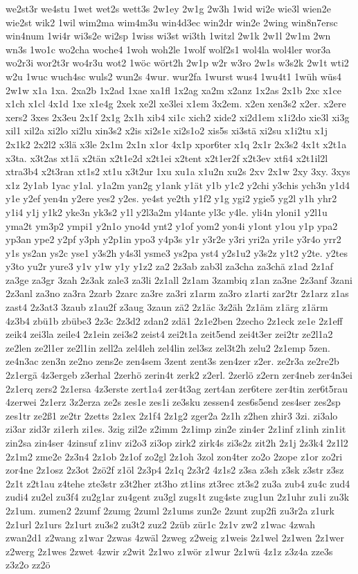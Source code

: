 {we2st3r
we4stu
1wet
wet2s
wett3s
2w1ey
2w1g
2w3h
1wid
wi2e
wie3l
wien2e
wie2st
wik2
1wil
wim2ma
wim4m3u
win4d3ec
win2dr
win2e
2wing
win8n7ersc
win4num
1wi4r
wi3s2e
wi2sp
1wiss
wi3st
wi3th
1witzl
2w1k
2w1l
2w1m
2wn
wn3s
1wo1c
wo2cha
woche4
1woh
woh2le
1wolf
wolf2s1
wol4la
wol4ler
wor3a
wo2r3i
wor2t3r
wo4r3u
wot2
1wöc
wört2h
2w1p
w2r
w3ro
2w1s
w3s2k
2w1t
wti2
w2u
1wuc
wuch4sc
wuls2
wun2s
4wur.
wur2fa
1wurst
wus4
1wu4t1
1wüh
wüs4
2w1w
x1a
1xa.
2xa2b
1x2ad
1xae
xa1fl
1x2ag
xa2m
x2anz
1x2as
2x1b
2xc
x1ce
x1ch
x1cl
4x1d
1xe
x1e4g
2xek
xe2l
xe3lei
x1em
3x2em.
x2en
xen3s2
x2er.
x2ere
xers2
3xes
2x3eu
2x1f
2x1g
2x1h
xib4
xi1c
xich2
xide2
xi2d1em
x1i2do
xie3l
xi3g
xil1
xil2a
xi2lo
xi2lu
xin3s2
x2is
xi2s1e
xi2s1o2
xis5s
xi3stä
xi2su
x1i2tu
x1j
2x1k2
2x2l2
x3lä
x3le
2x1m
2x1n
x1or
4x1p
xpor6ter
x1q
2x1r
2x3s2
4x1t
x2t1a
x3ta.
x3t2as
xt1ä
x2tän
x2t1e2d
x2t1ei
x2tent
x2t1er2f
x2t3ev
xtfi4
x2t1il2l
xtra3b4
x2t3ran
xt1s2
xt1u
x3t2ur
1xu
xu1a
x1u2n
xu2s
2xv
2x1w
2xy
3xy.
3xys
x1z
2y1ab
1yac
y1al.
y1a2m
yan2g
y1ank
y1ät
y1b
y1c2
y2chi
y3chis
ych3n
y1d4
y1e
y2ef
yen4n
y2ere
yes2
y2es.
ye4st
ye2th
y1f2
y1g
ygi2
ygie5
yg2l
y1h
yhr2
y1i4
y1j
y1k2
yke3n
yk3s2
y1l
y2l3a2m
yl4ante
yl3c
y4le.
yli4n
yloni1
y2l1u
yma2t
ym3p2
ympi1
y2n1o
yno4d
ynt2
y1of
yom2
yon4i
y1ont
y1ou
y1p
ypa2
yp3an
ype2
y2pf
y3ph
y2p1in
ypo3
y4p3s
y1r
y3r2e
y3ri
yri2a
yri1e
y3r4o
yrr2
y1s
ys2an
ys2c
yse1
y3s2h
y4s3l
ysme3
ys2pa
yst4
y2s1u2
y3s2z
y1t2
y2te.
y2tes
y3to
yu2r
yure3
y1v
y1w
y1y
y1z2
za2
2z3ab
zab3l
za3cha
za3chä
z1ad
2z1af
za3ge
za3gr
3zah
2z3ak
zale3
za3li
2z1all
2z1am
3zambiq
z1an
za3ne
2z3anf
3zani
2z3anl
za3no
za3ra
2zarb
2zarc
za3re
za3ri
z1arm
za3ro
z1arti
zar2tr
2z1arz
z1as
zast4
2z3at3
3zaub
z1au2f
z3aug
3zaun
zä2
2z1äc
3z2äh
2z1äm
z1ärg
z1ärm
4z3b4
zbü1b
zbübe3
2z3c
2z3d2
zdan2
zdä1
2z1e2ben
2zecho
2z1eck
ze1e
2z1eff
zeik4
zei3la
zeile4
2z1ein
zei3s2
zeist4
zei2t1a
zeit5end
zei4t3er
zei2tr
ze2l1a2
ze2len
ze2l1er
ze2l1in
zell2a
zel4leh
zel4lin
zel3sz
zel3t2h
zelu2
2z1emp
5zen.
ze4n3ac
zen3n
ze2no
zens2e
zen4sem
3zent
zent3s
zen4zer
z2er.
ze2r3a
ze2re2b
2z1ergä
4z3ergeb
z3erhal
2zerhö
zerin4t
zerk2
z2erl.
2zerlö
z2ern
zer4neb
zer4n3ei
2z1erq
zers2
2z1ersa
4z3erste
zert1a4
zer4t3ag
zert4an
zer6tere
zer4tin
zer6t5rau
4zerwei
2z1erz
3z2erza
ze2s
zes1e
zes1i
ze3sku
zessen4
zes6s5end
zes4ser
zes2sp
zes1tr
ze2ß1
ze2tr
2zetts
2z1ex
2z1f4
2z1g2
zger2a
2z1h
z2hen
zhir3
3zi.
zi3alo
zi3ar
zid3r
zi1erh
zi1es.
3zig
zil2e
z2imm
2z1imp
zin2e
zin4er
2z1inf
z1inh
zin1it
zin2sa
zin4ser
4zinsuf
z1inv
zi2o3
zi3op
zirk2
zirk4s
zi3s2z
zit2h
2z1j
2z3k4
2z1l2
2z1m2
zme2e
2z3n4
2z1ob
2z1of
zo2gl
2z1oh
3zol
zon4ter
zo2o
2zope
z1or
zo2ri
zor4ne
2z1osz
2z3ot
2zö2f
z1öl
2z3p4
2z1q
2z3r2
4z1s2
z3sa
z3sh
z3sk
z3str
z3sz
2z1t
z2t1au
z4tehe
zte3str
z3t2her
zt3ho
zt1ins
zt3rec
zt3s2
zu3a
zub4
zu4c
zud4
zudi4
zu2el
zu3f4
zu2g1ar
zu4gent
zu3gl
zugs1t
zug4ste
zug1un
2z1uhr
zu1i
zu3k
2z1um.
zumen2
2zumf
2zumg
2zuml
2z1ums
zun2e
2zunt
zup2fi
zu3r2a
z1urk
2z1url
2z1urs
2z1urt
zu3s2
zu3t2
zuz2
2züb
zür1c
2z1v
zw2
z1wac
4zwah
zwan2d1
z2wang
z1war
2zwas
4zwäl
2zweg
z2weig
z1weis
2z1wel
2z1wen
2z1wer
z2werg
2z1wes
2zwet
4zwir
z2wit
2z1wo
z1wör
z1wur
2z1wü
4z1z
z3z4a
zze3s
z3z2o
zz2ö
}

\endinput

